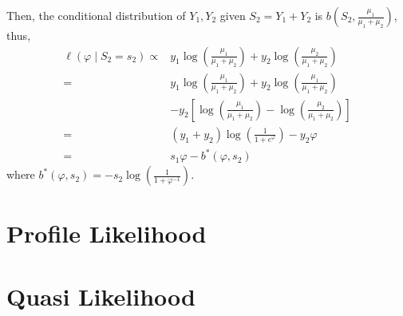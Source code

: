 \begin{solution}
\begin{enumerate}
              Then, the conditional distribution of $Y_{1},Y_{2}$ given $S_{2}=Y_{1}+Y_{2}$ is $b\left(S_{2},\frac{\mu_{1}}{\mu_{1}+\mu_{2}}\right)$, thus,
              \begin{equation*}
                  \begin{aligned}
                      \ell\left(\varphi\mid S_{2}=s_{2}\right)\propto & y_{1}\log\left(\frac{\mu_{1}}{\mu_{1}+\mu_{2}}\right)+y_{2}\log\left(\frac{\mu_{2}}{\mu_{1}+\mu_{2}}\right)          \\
                      =                                               & y_{1}\log\left(\frac{\mu_{1}}{\mu_{1}+\mu_{2}}\right)+y_{2}\log\left(\frac{\mu_{1}}{\mu_{1}+\mu_{2}}\right)          \\
                                                                      & -y_{2}\left[\log\left(\frac{\mu_{1}}{\mu_{1}+\mu_{2}}\right)-\log\left(\frac{\mu_{2}}{\mu_{1}+\mu_{2}}\right)\right] \\
                      =                                               & \left(y_{1}+y_{2}\right)\log\left(\frac{1}{1+e^{\varphi}}\right)-y_{2}\varphi                                        \\
                      =                                               & s_{1}\varphi-b^{*}\left(\varphi,s_{2}\right)
                  \end{aligned}
              \end{equation*}
              where $b^{*}\left(\varphi,s_{2}\right)=-s_{2}\log\left(\frac{1}{1+\varphi^{-1}}\right)$.
    \end{enumerate}
\end{solution}

\section{Profile Likelihood}

\section{Quasi Likelihood}